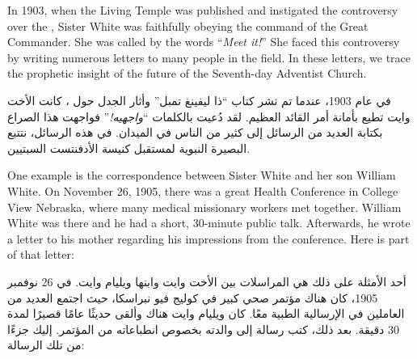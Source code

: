  \label{chap:apostasy}


 \label{chap:apostasy}


In 1903, when the Living Temple was published and instigated the controversy over the , Sister White was faithfully obeying the command of the Great Commander. She was called by the words “\textit{Meet it!}” She faced this controversy by writing numerous letters to many people in the field. In these letters, we trace the prophetic insight of the future of the Seventh-day Adventist Church.


في عام 1903، عندما تم نشر كتاب “ذا ليفينغ تمبل” وأثار الجدل حول ، كانت الأخت وايت تطيع بأمانة أمر القائد العظيم. لقد دُعيت بالكلمات “\textit{واجهيه!}” فواجهت هذا الصراع بكتابة العديد من الرسائل إلى كثير من الناس في الميدان. في هذه الرسائل، نتتبع البصيرة النبوية لمستقبل كنيسة الأدفنتست السبتيين.


One example is the correspondence between Sister White and her son William White. On November 26, 1905, there was a great Health Conference in College View Nebraska, where many medical missionary workers met together. William White was there and he had a short, 30-minute public talk. Afterwards, he wrote a letter to his mother regarding his impressions from the conference. Here is part of that letter:


أحد الأمثلة على ذلك هي المراسلات بين الأخت وايت وابنها ويليام وايت. في 26 نوفمبر 1905، كان هناك مؤتمر صحي كبير في كوليج فيو نبراسكا، حيث اجتمع العديد من العاملين في الإرسالية الطبية معًا. كان ويليام وايت هناك وألقى حديثًا عامًا قصيرًا لمدة 30 دقيقة. بعد ذلك، كتب رسالة إلى والدته بخصوص انطباعاته من المؤتمر. إليك جزءًا من تلك الرسالة:


 \\
 \\


 \\
 \\


